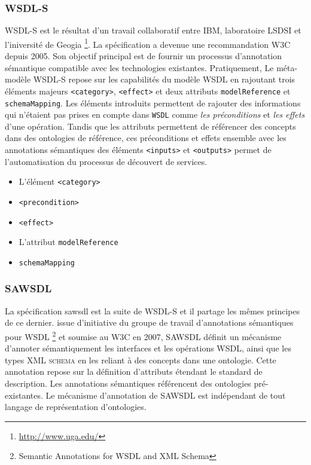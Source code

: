      \subsubsection{WSDL-S}
      \textsc{WSDL-S} \cite{akkiraju2005web} est le résultat d'un travail
      collaboratif entre IBM, laboratoire LSDSI et l'iniversité de Geogia
      \footnote{\url{http://www.uga.edu/}}.  La spécification a devenue une
      recommandation \textsc{W3C} depuis 2005. Son objectif principal est de
      fournir un processus d'annotation sémantique compatible avec les
      technologies existantes. Pratiquement, Le méta-modèle \textsc{WSDL-S}
      repose sur les capabilités du modèle \textsc{WSDL} en rajoutant trois
      éléments majeurs \texttt{<category>}, \texttt{<effect>} et deux
      attributs \texttt{modelReference} et \texttt{schemaMapping}. Les
      éléments introduits permettent de rajouter des informations qui
      n'étaient pas prises en compte dans \texttt{WSDL} comme \emph{les
        préconditions} et \emph{les effets} d'une opération. Tandis que les
      attributs permettent de référencer des concepts dans des ontologies de
      référence, ces préconditions et effets ensemble avec les annotations
      sémantiques des éléments \texttt{<inputs>} et \texttt{<outputs>}
      permet de l'automatisation du processus de découvert de services.


      \begin{itemize} %
      \item L'élément \texttt{<category>}
      \item \texttt{<precondition>}
      \item \texttt{<effect>}
      \item L'attribut \texttt{modelReference}
      \item \texttt{schemaMapping}
      \end{itemize}

      \subsubsection{SAWSDL}	    
      La spécification \acrshort{sawsdl} \cite{kopecky2007sawsdl} est la
      suite de \textsc{WSDL-S} et il partage les mêmes principes de ce
      dernier. issue d'initiative du groupe de travail d'annotations
      sémantiques pour \textsc{WSDL} \footnote{Semantic Annotations for WSDL
        and XML Schema} et soumise au \textsc{W3C} en 2007, \textsc{SAWSDL}
      définit un mécanisme d'annoter sémantiquement les interfaces et les
      opérations \textsc{WSDL}, ainsi que les types \textsc{XML schema} en
      les reliant à des concepts dans une ontologie.  Cette annotation
      repose sur la définition d'attributs étendant le standard de
      description.  Les annotations sémantiques référencent des ontologies
      pré-existantes. Le mécanisme d'annotation de \textsc{SAWSDL} est
      indépendant de tout langage de représentation
      \cite{lopez2008selection} d'ontologies.

